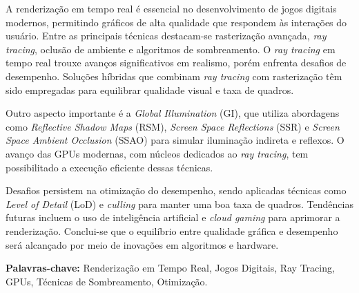 \documentclass[a4paper,brazil,ruledheader,normaltoc,capchap,twoside,openany]{abnt_pucmg_utf8}
\begin{document}






\capa
{}
\folhaderosto

\begin{resumo}
A renderização em tempo real é essencial no desenvolvimento de jogos digitais modernos, permitindo gráficos de alta qualidade que respondem às interações do usuário. Entre as principais técnicas destacam-se rasterização avançada, \textit{ray tracing}, oclusão de ambiente e algoritmos de sombreamento. O \textit{ray tracing} em tempo real trouxe avanços significativos em realismo, porém enfrenta desafios de desempenho. Soluções híbridas que combinam \textit{ray tracing} com rasterização têm sido empregadas para equilibrar qualidade visual e taxa de quadros.

Outro aspecto importante é a \textit{Global Illumination} (GI), que utiliza abordagens como \textit{Reflective Shadow Maps} (RSM), \textit{Screen Space Reflections} (SSR) e \textit{Screen Space Ambient Occlusion} (SSAO) para simular iluminação indireta e reflexos. O avanço das GPUs modernas, com núcleos dedicados ao \textit{ray tracing}, tem possibilitado a execução eficiente dessas técnicas.

Desafios persistem na otimização do desempenho, sendo aplicadas técnicas como \textit{Level of Detail} (LoD) e \textit{culling} para manter uma boa taxa de quadros. Tendências futuras incluem o uso de inteligência artificial e \textit{cloud gaming} para aprimorar a renderização. Conclui-se que o equilíbrio entre qualidade gráfica e desempenho será alcançado por meio de inovações em algoritmos e hardware.


\vspace{0.5cm}
\noindent \textbf{Palavras-chave:} Renderização em Tempo Real, Jogos Digitais, Ray Tracing, GPUs, Técnicas de Sombreamento, Otimização.
\end{resumo}
\end{document}
